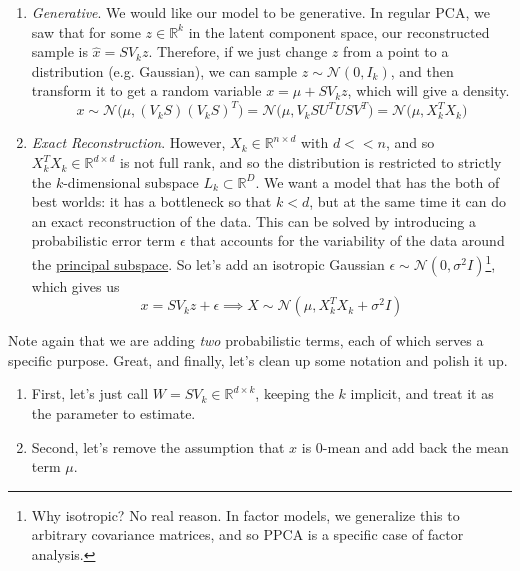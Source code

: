   \begin{enumerate}
    \item \textit{Generative}. We would like our model to be generative. In regular PCA, we saw that for some $z \in \mathbb{R}^k$ in the latent component space, our reconstructed sample is $\hat{x} = S V_k z$. Therefore, if we just change $z$ from a point to a distribution (e.g. Gaussian), we can sample $z \sim \mathcal{N}(0, I_k)$, and then transform it to get a random variable $x = \mu + S V_k z$, which will give a density. 
    \begin{equation}
      x \sim \mathcal{N} \big( \mu, (V_k S)(V_k S)^T \big) = \mathcal{N} \big( \mu, V_k S U^T U S V^T \big) = \mathcal{N} \big( \mu, X_k^T X_k)
    \end{equation} 

    \item \textit{Exact Reconstruction}. However, $X_k \in \mathbb{R}^{n \times d}$ with $d << n$, and so $X_k^T X_k \in \mathbb{R}^{d \times d}$ is not full rank, and so the distribution is restricted to strictly the $k$-dimensional subspace $L_k \subset \mathbb{R}^D$. We want a model that has the both of best worlds: it has a bottleneck so that $k < d$, but at the same time it can do an exact reconstruction of the data. This can be solved by introducing a probabilistic error term $\epsilon$ that accounts for the variability of the data around the \hyperref[def:principal-subspace]{principal subspace}. So let's add an isotropic Gaussian $\epsilon \sim \mathcal{N}(0, \sigma^2 I)$\footnote{Why isotropic? No real reason. In factor models, we generalize this to arbitrary covariance matrices, and so PPCA is a specific case of factor analysis.}, which gives us 
    \begin{equation}
      x = S V_k z + \epsilon \implies X \sim \mathcal{N}(\mu, X_k^T X_k + \sigma^2 I)
    \end{equation} 
  \end{enumerate} 

  Note again that we are adding \textit{two} probabilistic terms, each of which serves a specific purpose. Great, and finally, let's clean up some notation and polish it up. 
  \begin{enumerate}
    \item First, let's just call $W = S V_k \in \mathbb{R}^{d \times k}$, keeping the $k$ implicit, and treat it as the parameter to estimate. 
    \item Second, let's remove the assumption that $x$ is $0$-mean and add back the mean term $\mu$. 
  \end{enumerate} 

